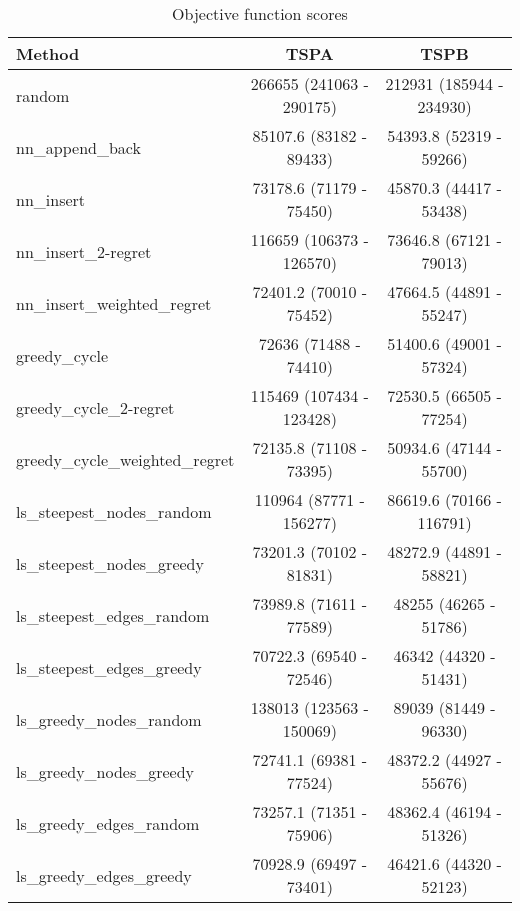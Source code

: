 \begin{table}[!htbp]
\centering
\caption{Objective function scores}
\begin{tabular}{lcc}
\hline
 Method & TSPA & TSPB \\
\hline
random & 266655 (241063 - 290175) & 212931 (185944 - 234930) \\
nn\_append\_back & 85107.6 (83182 - 89433) & 54393.8 (52319 - 59266) \\
nn\_insert & 73178.6 (71179 - 75450) & 45870.3 (44417 - 53438) \\
nn\_insert\_2-regret & 116659 (106373 - 126570) & 73646.8 (67121 - 79013) \\
nn\_insert\_weighted\_regret & 72401.2 (70010 - 75452) & 47664.5 (44891 - 55247) \\
greedy\_cycle & 72636 (71488 - 74410) & 51400.6 (49001 - 57324) \\
greedy\_cycle\_2-regret & 115469 (107434 - 123428) & 72530.5 (66505 - 77254) \\
greedy\_cycle\_weighted\_regret & 72135.8 (71108 - 73395) & 50934.6 (47144 - 55700) \\
ls\_steepest\_nodes\_random & 110964 (87771 - 156277) & 86619.6 (70166 - 116791) \\
ls\_steepest\_nodes\_greedy & 73201.3 (70102 - 81831) & 48272.9 (44891 - 58821) \\
ls\_steepest\_edges\_random & 73989.8 (71611 - 77589) & 48255 (46265 - 51786) \\
ls\_steepest\_edges\_greedy & 70722.3 (69540 - 72546) & 46342 (44320 - 51431) \\
ls\_greedy\_nodes\_random & 138013 (123563 - 150069) & 89039 (81449 - 96330) \\
ls\_greedy\_nodes\_greedy & 72741.1 (69381 - 77524) & 48372.2 (44927 - 55676) \\
ls\_greedy\_edges\_random & 73257.1 (71351 - 75906) & 48362.4 (46194 - 51326) \\
ls\_greedy\_edges\_greedy & 70928.9 (69497 - 73401) & 46421.6 (44320 - 52123) \\
\hline
\end{tabular}
\end{table}
